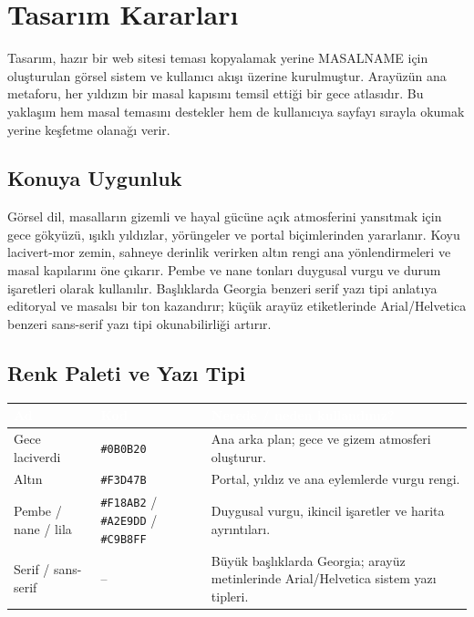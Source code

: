 \documentclass[12pt,a4paper]{article}
\begin{document}
\section{Tasarım Kararları}
Tasarım, hazır bir web sitesi teması kopyalamak yerine MASALNAME için oluşturulan görsel sistem ve kullanıcı akışı üzerine kurulmuştur. Arayüzün ana metaforu, her yıldızın bir masal kapısını temsil ettiği bir gece atlasıdır. Bu yaklaşım hem masal temasını destekler hem de kullanıcıya sayfayı sırayla okumak yerine keşfetme olanağı verir.

\subsection{Konuya Uygunluk}
Görsel dil, masalların gizemli ve hayal gücüne açık atmosferini yansıtmak için gece gökyüzü, ışıklı yıldızlar, yörüngeler ve portal biçimlerinden yararlanır. Koyu lacivert-mor zemin, sahneye derinlik verirken altın rengi ana yönlendirmeleri ve masal kapılarını öne çıkarır. Pembe ve nane tonları duygusal vurgu ve durum işaretleri olarak kullanılır. Başlıklarda Georgia benzeri serif yazı tipi anlatıya editoryal ve masalsı bir ton kazandırır; küçük arayüz etiketlerinde Arial/Helvetica benzeri sans-serif yazı tipi okunabilirliği artırır.

\subsection{Renk Paleti ve Yazı Tipi}
\begin{center}
\begin{tabular}{@{}llp{6.4cm}@{}}
\toprule
\rowcolor{ana}\textcolor{white}{\textbf{Ad}} & \textcolor{white}{\textbf{Kod}} & \textcolor{white}{\textbf{Nerede / neden kullandınız?}} \\
\midrule
Gece laciverdi & \texttt{\#0B0B20} & Ana arka plan; gece ve gizem atmosferi oluşturur. \\
Altın & \texttt{\#F3D47B} & Portal, yıldız ve ana eylemlerde vurgu rengi. \\
Pembe / nane / lila & \texttt{\#F18AB2} / \texttt{\#A2E9DD} / \texttt{\#C9B8FF} & Duygusal vurgu, ikincil işaretler ve harita ayrıntıları. \\
Serif / sans-serif & -- & Büyük başlıklarda Georgia; arayüz metinlerinde Arial/Helvetica sistem yazı tipleri. \\
\bottomrule
\end{tabular}
\end{center}
\end{document}
